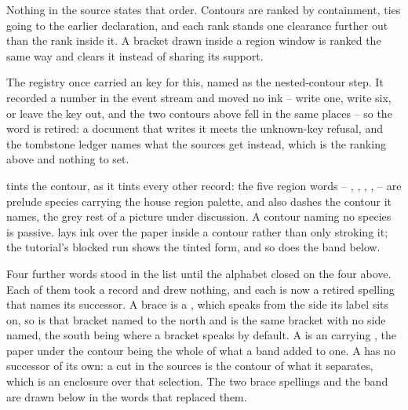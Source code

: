 Nothing in the source states that order.  Contours are ranked by
containment, ties going to the earlier declaration, and each rank stands
one clearance further out than the rank inside it.  A bracket drawn
inside a region window is ranked the same way and clears it instead of
sharing its support.

\dbendpar The registry once carried an  key for this,
named as the nested-contour step.  It recorded a number in the event
stream and moved no ink -- write one, write six, or leave the key out,
and the two contours above fell in the same places -- so the word is
retired: a document that writes it meets the unknown-key refusal, and
the tombstone ledger names what the sources get instead, which is the
ranking above and nothing to set.

 tints the contour, as it tints every other record: the
five region words -- , ,
, ,  -- are prelude
species carrying the house region palette, and  also
dashes the contour it names, the grey rest of a picture under
discussion.  A contour naming no species is passive.   lays
ink over the paper inside a contour rather than only stroking it; the
tutorial's blocked run shows the tinted form, and so does the band
below.

Four further words stood in the  list until the alphabet
closed on the four above.  Each of them took a record and drew nothing,
and each is now a retired spelling that names its successor.  A brace is
a , which speaks from the side its label sits on, so
 is that bracket named to the north and
 is the same bracket with no side named, the south
being where a bracket speaks by default.  A  is an
 carrying , the paper under the contour
being the whole of what a band added to one.  A  has no
successor of its own: a cut in the sources is the contour of what it
separates, which is an enclosure over that selection.  The two brace
spellings and the band are drawn below in the words that replaced them.

